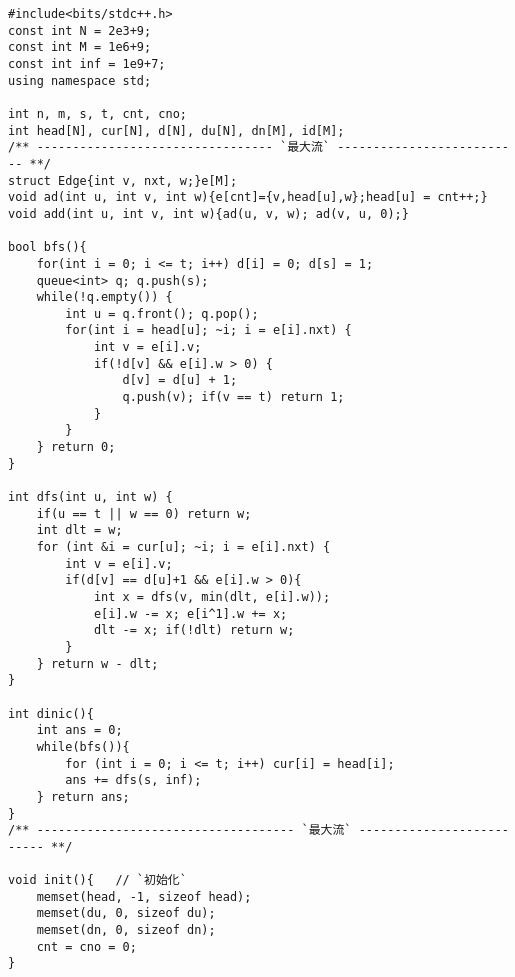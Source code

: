 \begin{lstlisting}
#include<bits/stdc++.h>
const int N = 2e3+9;
const int M = 1e6+9;
const int inf = 1e9+7;
using namespace std;

int n, m, s, t, cnt, cno;
int head[N], cur[N], d[N], du[N], dn[M], id[M];
/** --------------------------------- `最大流` -------------------------- **/
struct Edge{int v, nxt, w;}e[M];
void ad(int u, int v, int w){e[cnt]={v,head[u],w};head[u] = cnt++;}
void add(int u, int v, int w){ad(u, v, w); ad(v, u, 0);}

bool bfs(){
    for(int i = 0; i <= t; i++) d[i] = 0; d[s] = 1;
    queue<int> q; q.push(s);
    while(!q.empty()) {
        int u = q.front(); q.pop();
        for(int i = head[u]; ~i; i = e[i].nxt) {
            int v = e[i].v;
            if(!d[v] && e[i].w > 0) {
                d[v] = d[u] + 1;
                q.push(v); if(v == t) return 1;
            }
        }
    } return 0;
}

int dfs(int u, int w) {
    if(u == t || w == 0) return w;
    int dlt = w;
    for (int &i = cur[u]; ~i; i = e[i].nxt) {
        int v = e[i].v;
        if(d[v] == d[u]+1 && e[i].w > 0){
            int x = dfs(v, min(dlt, e[i].w));
            e[i].w -= x; e[i^1].w += x;
            dlt -= x; if(!dlt) return w;
        }
    } return w - dlt;
}

int dinic(){
    int ans = 0;
    while(bfs()){
        for (int i = 0; i <= t; i++) cur[i] = head[i];
        ans += dfs(s, inf);
    } return ans;
}
/** ------------------------------------ `最大流` -------------------------- **/

void init(){   // `初始化`
    memset(head, -1, sizeof head);
    memset(du, 0, sizeof du);
    memset(dn, 0, sizeof dn);
    cnt = cno = 0;
}


\end{lstlisting}
